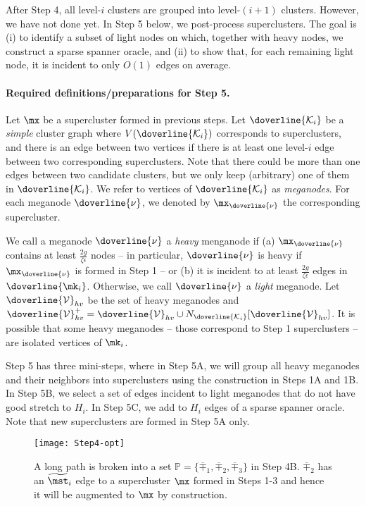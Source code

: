 After Step 4, all level-$i$ clusters are grouped into level-$(i+1)$ clusters. However, we have not done yet. In Step 5 below, we post-process superclusters. The goal is (i) to identify a subset of light nodes on which, together with heavy nodes, we construct a sparse spanner oracle, and (ii)  to show that, for each remaining light node, it is incident to only $O(1)$ edges on average.

\paragraph{Required definitions/preparations for Step 5.~} Let $\mx$ be a supercluster formed in previous steps.  Let $\doverline{\mathcal{K}_i}$ be a \emph{simple} cluster graph where $V(\doverline{\mathcal{K}_i})$ corresponds to superclusters, and there is an edge between two vertices if there is at least one level-$i$ edge between two corresponding superclusters. Note that there could be more than one edges between two candidate clusters, but we only keep (arbitrary) one of them in $\doverline{\mathcal{K}_i}$. We refer to vertices of $\doverline{\mathcal{K}_i}$  as \emph{meganodes}. For each meganode $\doverline{\nu}$, we denoted by $\mx_{\doverline{\nu}}$ the corresponding supercluster. 



We call a meganode $\doverline{\nu}$ a \emph{heavy} menganode if (a) $\mx_{\doverline{\nu}}$ contains at least $\frac{2g}{\zeta\epsilon}$ nodes -- in particular, $\doverline{\nu}$ is heavy if $\mx_{\doverline{\nu}}$ is formed in Step 1 -- or (b) it is incident to at least $\frac{2g}{\zeta\epsilon}$ edges in $\doverline{\mk_i}$. Otherwise, we call $\doverline{\nu}$ a \emph{light} meganode. Let $\doverline{\mathcal{V}}_{hv}$ be the set of heavy meganodes and $\doverline{\mathcal{V}}^+_{hv} = \doverline{\mathcal{V}}_{hv} \cup N_{\doverline{\mathcal{K}_i}}[\doverline{\mathcal{V}}_{hv}]$. It is possible that some heavy meganodes  --  those correspond to Step 1 superclusters -- are isolated vertices of $\mk_i$. 


Step 5 has three mini-steps, where in Step 5A, we will group all heavy meganodes and their neighbors into superclusters using the construction in Steps 1A and 1B. In Step 5B, we select a set of edges incident to light meganodes that do not have good stretch to $H_i$. In Step 5C, we add to $H_i$ edges of a sparse spanner oracle. Note that new superclusters are formed in Step 5A only.

\begin{wrapfigure}{r}{0.4\textwidth}
	\vspace{-25pt}
	\begin{center}
		\texttt{[image: Step4-opt]}
	\end{center}
	\caption{\footnotesize{A long path is broken into a set $\mathbb{P} = \{\overline{\mp}_1, \overline{\mp}_2,\overline{\mp}_3\}$ in Step 4B. $\overline{\mp}_2$ has an $\widetilde{\mst}_i$ edge to a supercluster $\mx$ formed in Steps 1-3 and hence it will be augmented to $\mx$ by construction.}}
	\vspace{-35pt}
	\label{fig:Step4-opt}
\end{wrapfigure}


